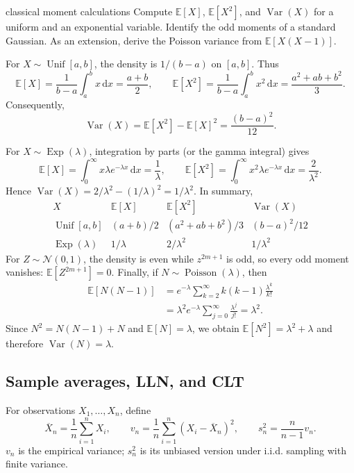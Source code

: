 \documentclass[10pt]{article}
\newcommand{\E}{\mathbb E}
\newcommand{\Var}{\operatorname{Var}}
\newcommand{\1}{\mathbf 1}
\newcommand{\dd}{\,\mathrm d}
\theoremstyle{definition}
\begin{document}
\begin{studentexercise}{classical moment calculations}
Compute $\E[X]$, $\E[X^2]$, and $\Var(X)$ for a uniform and an exponential
variable. Identify the odd moments of a standard Gaussian. As an extension,
derive the Poisson variance from $\E[X(X-1)]$.
\end{studentexercise}
\begin{shortsolution}
For $X\sim\operatorname{Unif}[a,b]$, the density is $1/(b-a)$ on $[a,b]$.
Thus
\[
\E[X]=\frac1{b-a}\int_a^b x\dd x=\frac{a+b}{2},
\qquad
\E[X^2]=\frac1{b-a}\int_a^b x^2\dd x
=\frac{a^2+ab+b^2}{3}.
\]
Consequently,
\[
\Var(X)=\E[X^2]-\E[X]^2=\frac{(b-a)^2}{12}.
\]

For $X\sim\operatorname{Exp}(\lambda)$, integration by parts (or the gamma
integral) gives
\[
\E[X]=\int_0^\infty x\lambda e^{-\lambda x}\dd x=\frac1\lambda,
\qquad
\E[X^2]=\int_0^\infty x^2\lambda e^{-\lambda x}\dd x
=\frac2{\lambda^2}.
\]
Hence $\Var(X)=2/\lambda^2-(1/\lambda)^2=1/\lambda^2$. In summary,
\[
\begin{array}{c|ccc}
X&\E[X]&\E[X^2]&\Var(X)\\ \hline
\operatorname{Unif}[a,b]&(a+b)/2&(a^2+ab+b^2)/3&(b-a)^2/12\\
\operatorname{Exp}(\lambda)&1/\lambda&2/\lambda^2&1/\lambda^2
\end{array}
\]
For $Z\sim\mathcal N(0,1)$, the density is even while $z^{2m+1}$ is odd, so
every odd moment vanishes:
$\E[Z^{2m+1}]=0$. Finally, if
$N\sim\operatorname{Poisson}(\lambda)$, then
\begin{align*}
\E[N(N-1)]
&=e^{-\lambda}\sum_{k=2}^\infty k(k-1)\frac{\lambda^k}{k!}\\
&=\lambda^2e^{-\lambda}\sum_{j=0}^\infty\frac{\lambda^j}{j!}
=\lambda^2.
\end{align*}
Since $N^2=N(N-1)+N$ and $\E[N]=\lambda$, we obtain
$\E[N^2]=\lambda^2+\lambda$ and therefore $\Var(N)=\lambda$.
\end{shortsolution}

\subsection{Sample averages, LLN, and CLT}

For observations $X_1,\ldots,X_n$, define
\[
\overline X_n=\frac1n\sum_{i=1}^nX_i,
\qquad
v_n=\frac1n\sum_{i=1}^n(X_i-\overline X_n)^2,
\qquad
s_n^2=\frac{n}{n-1}v_n.
\]
$v_n$ is the empirical variance; $s_n^2$ is its unbiased version under i.i.d.
sampling with finite variance.
\end{document}
